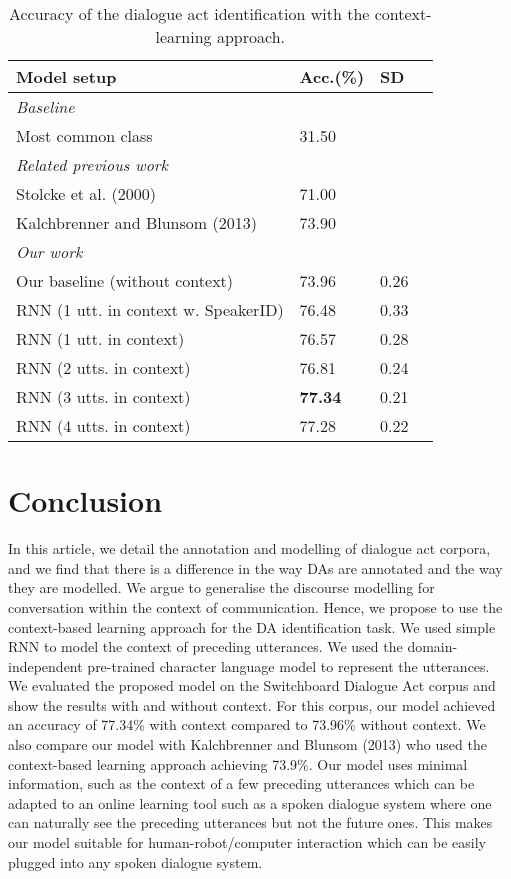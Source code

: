 \documentclass[10pt, a4paper]{article}
\begin{document}
\begin{table}[t]
\centering
\caption{Accuracy of the dialogue act identification with the context-learning approach. }
\begin{tabular}{llll}
\hline
Model setup                           &  Acc.(\%) & SD  \\
\hline
\textit{Baseline}                      &     \\
Most common class                      &  31.50   &  \\
\textit{Related previous work}         &          &   \\
Stolcke et al. (2000)                  &  71.00   &  \\
Kalchbrenner and Blunsom (2013)        &  73.90   &  \\


\textit{Our work}                      &          &     \\
Our baseline (without context)         &   73.96   & 0.26 \\
RNN (1 utt. in context w. SpeakerID)   &   76.48   & 0.33 \\
RNN (1 utt. in context)                &   76.57   & 0.28 \\
RNN (2 utts. in context) \hspace{1cm}  &   76.81   & 0.24 \\
RNN (3 utts. in context) \hspace{1cm}  & \bf 77.34 & 0.21 \\
RNN (4 utts. in context) \hspace{1cm}  &   77.28   & 0.22 \\ \hline
\end{tabular}
\label{table:charResults}
\end{table}


\section{Conclusion}

In this article, we detail the annotation and modelling of dialogue act corpora, and we find that there is a difference in the way DAs are annotated and the way they are modelled.
We argue to generalise the discourse modelling for conversation within the context of communication.
Hence, we propose to use the context-based learning approach for the DA identification task.
We used simple RNN to model the context of preceding utterances. 
We used the domain-independent pre-trained character language model to represent the utterances.
We evaluated the proposed model on the Switchboard Dialogue Act corpus and show the results with and without context. 
For this corpus, our model achieved an accuracy of 77.34\% with context compared to 73.96\% without context.
We also compare our model with Kalchbrenner and Blunsom (2013) who used the context-based learning approach achieving 73.9\%.
Our model uses minimal information, such as the context of a few preceding utterances which can be adapted to an online learning tool such as a spoken dialogue system where one can naturally see the preceding utterances but not the future ones.
This makes our model suitable for human-robot/computer interaction which can be easily plugged into any spoken dialogue system.
\end{document}
